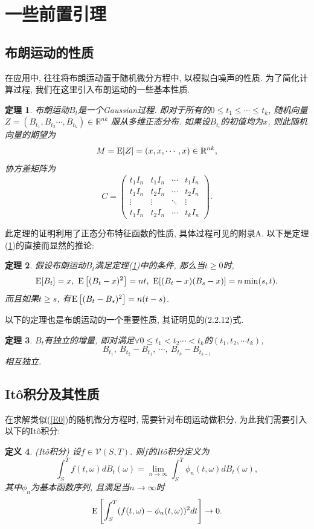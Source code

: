 \documentclass[notitlepage,cs4size,punct,oneside]{ctexrep}
\numberwithin{equation}{section}
\theoremstyle{mystyle}
\newtheorem{definition}{\hspace{2em}定义}[section]
\newtheorem{theorem}[definition]{\hspace{2em}定理}
\begin{document}
\section{一些前置引理}
\subsection{布朗运动的性质}
在应用中, 往往将布朗运动置于随机微分方程中, 以模拟白噪声的性质\cite{hida1980brownian}. 
为了简化计算过程, 我们在这里引入布朗运动的一些基本性质\cite{oksendal2003stochastic}\cite{nelson1967dynamical}.
\begin{theorem} \label{brownian1}
布朗运动$B_t$是一个Gaussian过程. 即对于所有的$0 \leqslant t_1 \leqslant\cdots\leqslant t_k$, 随机向量$Z = (B_{t_1}, B_{t_2}\cdots ,B_{t_k})\in \mathbb{R}^{nk}$ 服从多维正态分布. 如果设$B_{t_i}$的初值均为$x$, 则此随机向量的期望为 
$$M = \text{E}[Z] = (x, x, \cdots, x) \in \mathbb{R}^{nk},$$
协方差矩阵为
$$C = \left(\begin{matrix}
			t_1I_n & t_1I_n & \cdots & t_1I_n \\
			t_1I_n & t_2I_n & \cdots & t_2I_n \\
			\vdots & \vdots & \ddots & \vdots \\
			t_1I_n & t_2I_n & \cdots & t_kI_n 
			\end{matrix}
			\right).$$
\end{theorem}

此定理的证明利用了正态分布特征函数的性质, 具体过程可见\cite{oksendal2003stochastic}的附录A. 以下是定理(\ref{brownian1})的直接而显然的推论:
\begin{theorem}
假设布朗运动$B_t$满足定理(\ref{brownian1})中的条件, 那么当$t\geqslant 0$时,
$$\text{E}[B_t] = x, ~\text{E}\left[(B_t - x)^2\right] = nt, ~\text{E}[(B_t - x)(B_s - x)] = n\min(s, t).$$ 
而且如果$t \geqslant s$, 有$\text{E}\left[(B_t - B_s)^2\right] = n(t-s)$.
\end{theorem}

以下的定理也是布朗运动的一个重要性质, 其证明见\cite{oksendal2003stochastic}的(2.2.12)式.
\begin{theorem}
$B_t$有独立的增量, 即对满足$\forall 0 \leqslant t_1 < t_2 \cdots < t_k$的$(t_1, t_2, \cdots t_k)$,
$$B_{t_1}, ~B_{t_2}-B_{t_1}, ~\cdots, ~B_{t_k}-B_{t_{k-1}}$$相互独立.
\end{theorem}

\subsection{It\^{o}积分及其性质}
在求解类似(\ref{E0})的随机微分方程时, 需要针对布朗运动做积分, 为此我们需要引入以下的It\^{o}积分\cite{oksendal2003stochastic}\cite{lawler2006introduction}:
\begin{definition}(It\^{o}积分)	设$f\in\mathcal{V}(S, T)$. 则$f$的It\^{o}积分定义为
$$\int_S^T f(t, \omega)dB_t(\omega) = \lim_{n\to\infty}\int_S^T\phi_n(t, \omega)dB_t(\omega),$$
其中${\phi_n}$为基本函数序列, 且满足当$n \to \infty$时
$$\text{E}\left[\int_S^T (f(t, \omega)-\phi_n(t, \omega))^2dt\right] \to 0.$$
\end{definition}
\end{document}
